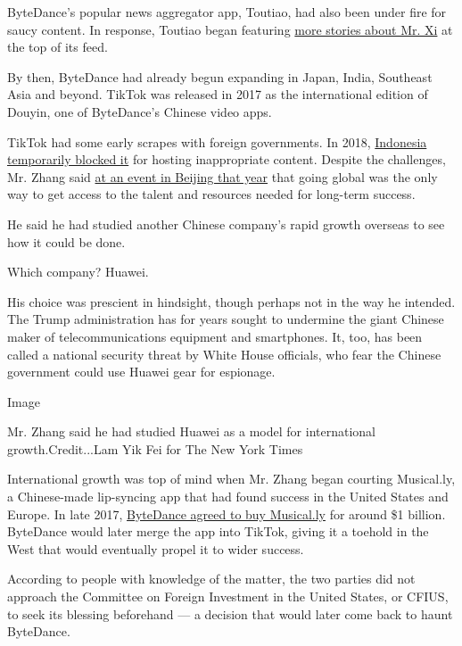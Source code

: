 ByteDance's popular news aggregator app, Toutiao, had also been under
fire for saucy content. In response, Toutiao began featuring
\href{https://www.nytimes.com/2018/01/02/business/china-toutiao-censorship.html}{more
stories about Mr. Xi} at the top of its feed.

By then, ByteDance had already begun expanding in Japan, India,
Southeast Asia and beyond. TikTok was released in 2017 as the
international edition of Douyin, one of ByteDance's Chinese video apps.

TikTok had some early scrapes with foreign governments. In 2018,
\href{https://www.nytimes.com/2018/10/29/technology/bytedance-app-funding-china.html}{Indonesia
temporarily blocked it} for hosting inappropriate content. Despite the
challenges, Mr. Zhang said
\href{https://www.techbuzzchina.com/bytedance/bytedance-ceo-zhang-yiming-at-tsinghua-university-part-3}{at
an event in Beijing that year} that going global was the only way to get
access to the talent and resources needed for long-term success.

He said he had studied another Chinese company's rapid growth overseas
to see how it could be done.

Which company? Huawei.

His choice was prescient in hindsight, though perhaps not in the way he
intended. The Trump administration has for years sought to undermine the
giant Chinese maker of telecommunications equipment and smartphones. It,
too, has been called a national security threat by White House
officials, who fear the Chinese government could use Huawei gear for
espionage.

Image

Mr. Zhang said he had studied Huawei as a model for international
growth.Credit...Lam Yik Fei for The New York Times

International growth was top of mind when Mr. Zhang began courting
Musical.ly, a Chinese-made lip-syncing app that had found success in the
United States and Europe. In late 2017,
\href{https://www.nytimes.com/2017/11/10/business/dealbook/musically-sold-app-video.html}{ByteDance
agreed to buy Musical.ly} for around \$1 billion. ByteDance would later
merge the app into TikTok, giving it a toehold in the West that would
eventually propel it to wider success.

According to people with knowledge of the matter, the two parties did
not approach the Committee on Foreign Investment in the United States,
or CFIUS, to seek its blessing beforehand --- a decision that would
later come back to haunt ByteDance.

